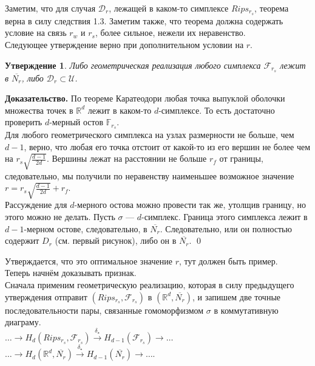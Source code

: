 \documentclass[english,12pt]{article}
\newcounter{stmcounter}[section]
\numberwithin{equation}{section}
\newtheorem{proposition}[stmcounter]{Утверждение}
\theoremstyle{definition}
\theoremstyle{remark}
\newenvironment{pf}{\noindent\textbf{Доказательство.}}{\qed}
\begin{document}
Заметим, что для случая $\mathcal{D}_r$, лежащей в каком-то симплексе $Rips_{r_s}$, теорема верна в силу следствия 1.3. Заметим также, что теорема должна содержать условие на связь $r_w$ и $r_s$, более сильное, нежели их неравенство.\\


Следующее утверждение верно при дополнительном условии на $r$.
\begin{proposition}
  Либо геометрическая реализация любого симплекса $\mathcal{F}_{r_s}$ лежит в $\overline{N_r}$, либо $\mathcal{D}_r \subset \mathcal{U}$.
\end{proposition}

\begin{pf}
  По теореме Каратеодори любая точка выпуклой оболочки множества точек в $\mathbb{R}^d$ лежит в каком-то $d$-симплексе. То есть достаточно проверить $d$-мерный остов $\mathbb{F}_{r_s}$.\\

  Для любого геометрического симплекса на узлах размерности не больше, чем $d-1$, верно, что любая его точка отстоит от какой-то из его вершин не более чем на $r_s\sqrt{\frac{d-1}{2d}}$. Вершины лежат на расстоянии не больше $r_f$ от границы, следовательно, мы получили по неравенству наименьшее возможное значение $r = r_s\sqrt{\frac{d-1}{2d}} + r_f$.\\

  Рассуждение для $d$-мерного остова можно провести так же, утолщив границу, но этого можно не делать. Пусть $\sigma$ --- $d$-симплекс. Граница этого симплекса лежит в $d-1$-мерном остове, следовательно, в $\overline{N_r}$. Следовательно, или он полностью содержит $D_r$ (см. первый рисунок), либо он в $\overline{N_r}$.
\end{pf}

Утверждается, что это оптимальное значение $r$, тут должен быть пример.\\

Теперь начнём доказывать признак.\\

Сначала применим геометрическую реализацию, которая в силу предыдущего утверждения отправит $(Rips_{r_s}, \mathcal{F}_{r_s})$ в $(\mathbb{R}^d,\overline{N_r})$, и запишем две точные последовательности пары, связанные гомоморфизмом $\sigma$ в коммутативную диаграму.\\

$\ldots \to H_d(Rips_{r_s}, \mathcal{F}_{r_s}) \xrightarrow{\delta_{\star}} H_{d-1}(\mathcal{F}_{r_s}) \to \ldots$\\
$\ldots \to H_d(\mathbb{R}^d,\overline{N_r}) \xrightarrow{\delta_{\star}} H_{d-1}(\overline{N_r}) \to \ldots$.\\
\end{document}
